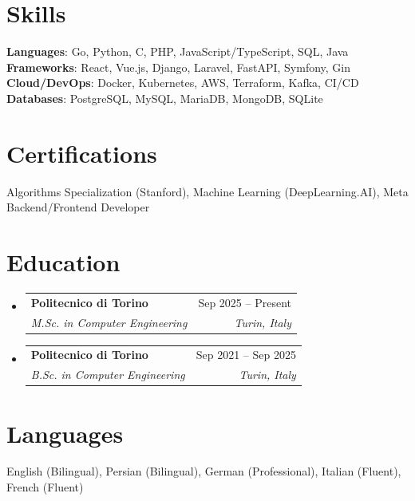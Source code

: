 \documentclass[11pt,a4paper]{article}
\makeatletter
\newcommand{\resumeSubheading}[4]{
  \vspace{-2pt}\item
    \begin{tabular*}{0.97\textwidth}[t]{l@{\extracolsep{\fill}}r}
      \textbf{#1} & #2 \\
      \textit{\small#3} & \textit{\small #4} \\
    \end{tabular*}\vspace{-7pt}
}
\newcommand{\resumeSubHeadingListStart}{\begin{itemize}[leftmargin=0.15in, label={}]}
\newcommand{\resumeSubHeadingListEnd}{\end{itemize}}
\makeatother
\begin{document}
\section{Skills}
 \begin{itemize}[leftmargin=0.15in, label={}]
    \small{\item{
     \textbf{Languages}{: Go, Python, C, PHP, JavaScript/TypeScript, SQL, Java} \\
     \textbf{Frameworks}{: React, Vue.js, Django, Laravel, FastAPI, Symfony, Gin} \\
     \textbf{Cloud/DevOps}{: Docker, Kubernetes, AWS, Terraform, Kafka, CI/CD} \\
     \textbf{Databases}{: PostgreSQL, MySQL, MariaDB, MongoDB, SQLite}
    }}
 \end{itemize}

\section{Certifications}
\begin{itemize}[leftmargin=0.15in, label={}]
    \small{\item{Algorithms Specialization (Stanford), Machine Learning (DeepLearning.AI), Meta Backend/Frontend Developer}}
\end{itemize}

\section{Education}
\resumeSubHeadingListStart
  \resumeSubheading
    {Politecnico di Torino}{Sep 2025 -- Present}
    {M.Sc. in Computer Engineering}{Turin, Italy}
  \resumeSubheading
    {Politecnico di Torino}{Sep 2021 -- Sep 2025}
    {B.Sc. in Computer Engineering}{Turin, Italy}
\resumeSubHeadingListEnd

\section{Languages}
    \small{English (Bilingual), Persian (Bilingual), German (Professional), Italian (Fluent), French (Fluent)}
\end{document}

